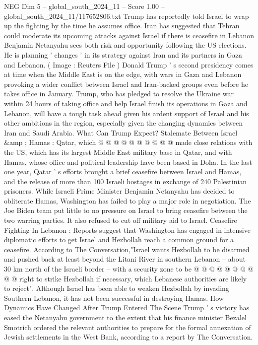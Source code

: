 \begin{textsample}{NEG Dim 5 – global\_south\_2024\_11 – Score 1.00 – global\_south\_2024\_11/117652806.txt}  \label{ex:f5_neg_427}
Trump has reportedly told Israel to wrap up the fighting by the time he assumes office.
Iran has suggested that Tehran could moderate its upcoming attacks against Israel if there is ceasefire in Lebanon Benjamin Netanyahu sees both risk and opportunity following the US elections.
He is planning ' changes ' in its strategy against Iran and its partners in Gaza and Lebanon. ( Image : Reuters File ) Donald Trump ' s second presidency comes at time when the Middle East is on the edge, with wars in Gaza and Lebanon provoking a wider conflict between Israel and Iran-backed groups even before he takes office in January.
Trump, who has pledged to resolve the Ukraine war within 24 hours of taking office and help Israel finish its operations in Gaza and Lebanon, will have a tough task ahead given his ardent support of Israel and his other ambitions in the region, especially given the changing dynamics between Iran and Saudi Arabia.
What Can Trump Expect?
Stalemate Between Israel \&amp ; Hamas : Qatar, which @ @ @ @ @ @ @ @ @ @ made close relations with the US, which has its largest Middle East military base in Qatar, and with Hamas, whose office and political leadership have been based in Doha.
In the last one year, Qatar ' s efforts brought a brief ceasefire between Israel and Hamas, and the release of more than 100 Israeli hostages in exchange of 240 Palestinian prisoners.
While Israeli Prime Minister Benjamin Netanyahu has decided to obliterate Hamas, Washington has failed to play a major role in negotiation.
The Joe Biden team put little to no pressure on Israel to bring ceasefire between the two warring parties.
It also refused to cut off military aid to Israel.
Ceasefire Fighting In Lebanon : Reports suggest that Washington has engaged in intensive diplomatic efforts to get Israel and Hezbollah reach a common ground for a ceasefire.
According to The Conversation,"Israel wants Hezbollah to be disarmed and pushed back at least beyond the Litani River in southern Lebanon -- about 30 km north of the Israeli border -- with a security zone to be @ @ @ @ @ @ @ @ @ @ right to strike Hezbollah if necessary, which Lebanese authorities are likely to reject".
Although Israel has been able to weaken Hezbollah by invading Southern Lebanon, it has not been successful in destroying Hamas.
How Dynamics Have Changed After Trump Entered The Scene Trump ' s victory has eased the Netanyahu government to the extent that his finance minister Bezalel Smotrich ordered the relevant authorities to prepare for the formal annexation of Jewish settlements in the West Bank, according to a report by The Conversation.

\end{textsample}

